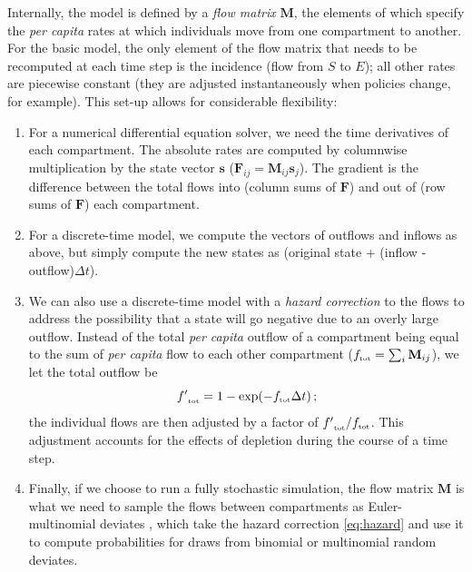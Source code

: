 \documentclass[12pt]{article}\usepackage[]{graphicx}\usepackage[]{color}
\begin{document}
Internally, the model is defined by a \emph{flow matrix} $\mathbf{M}$, the elements of which specify the \emph{per capita} rates at which individuals move from one compartment to another.
For the basic model, the only element of the flow matrix that needs to be recomputed at each time step is the incidence (flow from $S$ to $E$); all other rates are piecewise constant (they are adjusted instantaneously when policies change, for example).
This set-up allows for considerable flexibility:
\begin{enumerate}
\item For a numerical differential equation solver, we need the time derivatives of each compartment. The absolute rates are computed by columnwise multiplication by the state vector $\mathbf s$ (${\mathbf F}_{ij} = \mathbf{M}_{ij} \mathbf{s}_j$).
The gradient is the difference between the total flows into (column sums of $\mathbf F$) and out of (row sums of $\mathbf F$) each compartment.
\item For a discrete-time model, we compute the vectors of outflows and inflows as above, but simply compute the new states as (original state + (inflow - outflow)$\Delta t$).
\item We can also use a discrete-time model with a \emph{hazard correction} 
  to the flows to address the possibility that a state will go negative due to an overly large outflow. Instead of the total \emph{per capita} outflow of a compartment being equal to the sum of \emph{per capita} flow to each other compartment (${{f}_{\textrm{\tiny tot}}} = \sum_i {\mathbf M}_{ij}$), we let the total outflow be 
\begin{equation}\label{eq:hazard}
{{f'}_{\textrm{\tiny tot}}} = 1-\exp(-{{f}_{\textrm{\tiny tot}}} \Delta t) \,; 
\end{equation}
the individual flows are then adjusted by a factor of ${{f'}_{\textrm{\tiny tot}}}/{{f}_{\textrm{\tiny tot}}}$.  
This adjustment accounts for the effects of depletion during the course of a time step.
\item Finally, if we choose to run a fully stochastic simulation, the flow matrix $\mathbf M$ is what we need to sample the flows between compartments as Euler-multinomial deviates \cite{breto+09}, which take the hazard correction \eqref{eq:hazard} and use it to compute probabilities for draws from binomial or multinomial random deviates.
\end{enumerate}
\end{document}
